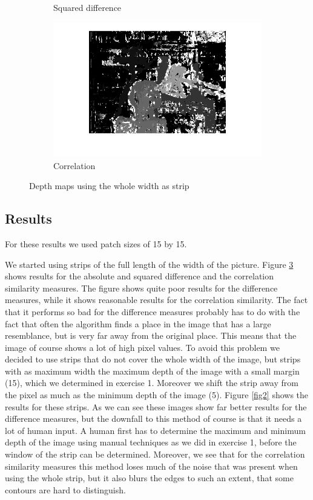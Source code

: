 \documentclass{article}
\begin{document}
\begin{figure}[ht!]
\begin{subfigure}{.49\textwidth}
  \caption{Squared difference}
  \label{fig1b}
 \end{subfigure}
 \begin{subfigure}{.49\textwidth}
  \centering
  \includegraphics[width=1\linewidth]{corr_dev15.png}
  \caption{Correlation}
  \label{fig1c}
 \end{subfigure}
 \caption{Depth maps using the whole width as strip}
 \label{fig1}
\end{figure}

\subsection{Results}
For these results we used patch sizes of 15 by 15.

We started using strips of the full length of the width of the picture. Figure \ref{fig1} shows results for the absolute and squared difference and the correlation similarity measures. The figure shows quite poor results for the difference measures, while it shows reasonable results for the correlation similarity. The fact that it performs so bad for the difference measures probably has to do with the fact that often the algorithm finds a place in the image that has a large resemblance, but is very far away from the original place. This means that the image of course shows a lot of high pixel values. To avoid this problem we decided to use strips that do not cover the whole width of the image, but strips with as maximum width the maximum depth of the image with a small margin (15), which we determined in exercise 1. Moreover we shift the strip away from the pixel as much as the minimum depth of the image (5). Figure \ref{fig2} shows the results for these strips. As we can see these images show far better results for the difference measures, but the downfall to this method of course is that it needs a lot of human input. A human first has to determine the maximum and minimum depth of the image using manual techniques as we did in exercise 1, before the window of the strip can be determined. Moreover, we see that for the correlation similarity measures this method loses much of the noise that was present when using the whole strip, but it also blurs the edges to such an extent, that some contours are hard to distinguish.
\end{document}
